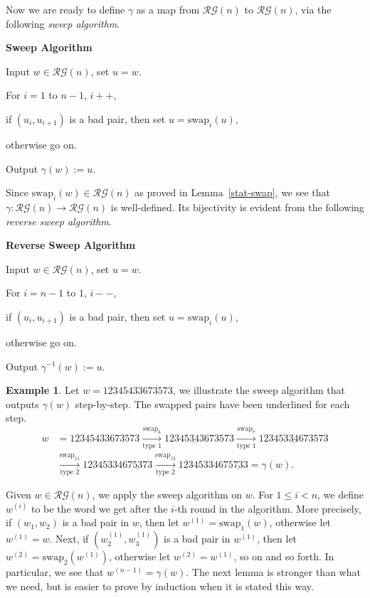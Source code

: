 \documentclass[12pt]{amsart}
\numberwithin{equation}{section}
\theoremstyle{plain}
\theoremstyle{definition}
\newtheorem{example}[theorem]{Example}
\def\swap{\mathrm{swap}}
\def\RG{\mathcal{RG}}
\begin{document}
Now we are ready to define $\gamma$ as a map from $\RG(n)$ to $\RG(n)$, via the following \emph{sweep algorithm}.

\begin{framed}
\begin{center}
\bf Sweep Algorithm
\end{center}
\noindent Input $w\in\RG(n)$, set $u=w$.\hfill

\noindent For $i=1$ to $n-1$, $i++$,\hfill

if $(u_i,u_{i+1})$ is a bad pair, then set $u=\swap_i(u)$, \hfill

\quad otherwise go on.\hfill

\noindent Output $\gamma(w):=u$.\hfill
\end{framed}

Since $\swap_i(w)\in\RG(n)$ as proved in Lemma~\ref{stat-swap}, we see that $\gamma:\RG(n)\rightarrow\RG(n)$ is well-defined. Its bijectivity is evident from the following \emph{reverse sweep algorithm}.

\begin{framed}
\begin{center}
\bf Reverse Sweep Algorithm
\end{center}
\noindent Input $w\in\RG(n)$, set $u=w$.\hfill

\noindent For $i=n-1$ to $1$, $i--$,\hfill

 if $(u_i,u_{i+1})$ is a bad pair, then set $u=\swap_i(u)$, \hfill

\quad otherwise go on.\hfill

\noindent Output $\gamma^{-1}(w):=u$.\hfill
\end{framed}

\begin{example} Let $w=12345433673573$, we illustrate the sweep algorithm that outputs $\gamma(w)$ step-by-step. The swapped pairs have been underlined for each step.
\begin{align*}
w &=12345433673573\xrightarrow[\text{type 1}]{\swap_6}12345\underline{34}3673573\xrightarrow[\text{type 1}]{\swap_7}123453\underline{34}673573\\
&\xrightarrow[\text{type 2}]{\swap_{11}}1234533467\underline{53}73\xrightarrow[\text{type 2}]{\swap_{12}}12345334675\underline{73}3=\gamma(w).
\end{align*}
\end{example}

Given $w\in\RG(n)$, we apply the sweep algorithm on $w$. For $1\le i<n$, we define $w^{(i)}$ to be the word we get after the $i$-th round in the algorithm. More precisely, if $(w_1,w_2)$ is a bad pair in $w$, then let $w^{(1)}=\swap_1(w)$, otherwise let $w^{(1)}=w$. Next, if $(w^{(1)}_2,w^{(1)}_3)$ is a bad pair in $w^{(1)}$, then let $w^{(2)}=\swap_2(w^{(1)})$, otherwise let $w^{(2)}=w^{(1)}$, so on and so forth. In particular, we see that $w^{(n-1)}=\gamma(w)$. The next lemma is stronger than what we need, but is easier to prove by induction when it is stated this way.
\end{document}
